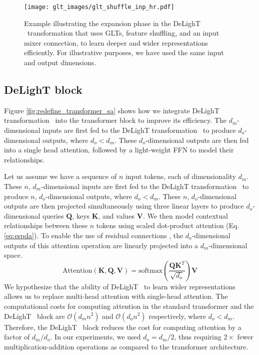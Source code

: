 \begin{figure}[t!]
    \centering
    \texttt{[image: glt\_images/glt\_shuffle\_inp\_hr.pdf]}
    \caption{Example illustrating the expansion phase in the DeLighT ~transformation that uses GLTs, feature shuffling, and an input mixer connection, to learn deeper and wider representations efficiently. For illustrative purposes, we have used the same input and output dimensions.}
    \label{fig:delight_layer_vis}
\end{figure}

\subsection{DeLighT block}  
\label{ssec:dextra_transformer} 
Figure \ref{fig:redefine_transformer_sa} shows how we integrate DeLighT transformation ~into the transformer block to improve its efficiency. The $d_m$-dimensional inputs are first fed to the DeLighT transformation ~to  produce $d_o$-dimensional outputs, where $d_o < d_m$. These $d_o$-dimensional outputs are then fed into a single head attention, followed by a light-weight FFN to model their relationships. 

 Let us assume we have a sequence of $n$ input tokens, each of dimensionality $d_m$. These $n$, $d_m$-dimensional inputs are first fed to the DeLighT transformation ~to produce $n$, $d_o$-dimensional outputs, where $d_o < d_m$.  These $n$, $d_o$-dimensional outputs are then projected simultaneously using three linear layers to produce $d_o$-dimensional queries $\mathbf{Q}$, keys $\mathbf{K}$, and  values $\mathbf{V}$. We then model contextual relationships between these $n$ tokens using scaled dot-product attention (Eq. \ref{eq:espda}). To enable the use of residual connections \citep{he2016deep}, the $d_o$-dimensional outputs of this attention operation are  linearly projected into a $d_m$-dimensional space.
\begin{equation}
    \text{Attention}(\mathbf{K}, \mathbf{Q}, \mathbf{V}) = \text{softmax}\left(\frac{\mathbf{Q}\mathbf{K}^T}{\sqrt{d_o}}\right) \mathbf{V}
    \label{eq:espda}
\end{equation}
We hypothesize that the ability of DeLighT ~to learn wider representations allows us to replace multi-head attention with single-head attention. The computational costs for computing attention in the standard transformer and the DeLighT ~block are $\mathcal{O}(d_m n^2)$ and $\mathcal{O}(d_o n^2)$ respectively, where $d_o < d_m$. Therefore, the DeLighT ~block reduces the cost for computing attention by a factor of $d_m/d_o$. In our experiments, we used $d_o=d_m/2$, thus requiring $2\times$ fewer multiplication-addition operations as compared to the transformer architecture. 

